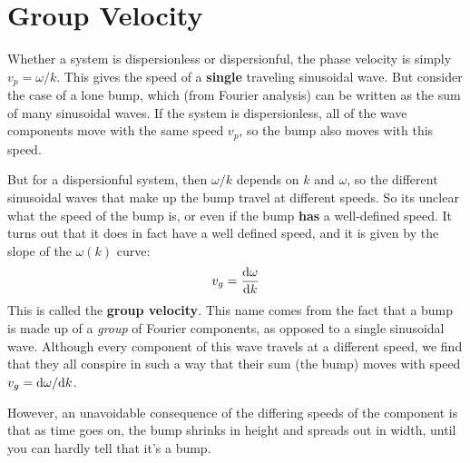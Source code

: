 \section{Group Velocity}
Whether a system is dispersionless or dispersionful, the phase velocity is simply $v_p = \omega/k$. This gives the speed of a \textbf{single} traveling sinusoidal wave. But consider the case of a lone bump, which (from Fourier analysis) can be written as the sum of many sinusoidal waves. If the system is dispersionless, all of the wave components move with the same speed $v_p$, so the bump also moves with this speed. 

But for a dispersionful system, then $\omega/k$ depends on $k$ and $\omega$, so the different sinusoidal waves that make up the bump travel at different speeds. So its unclear what the speed of the bump is, or even if the bump \textbf{has} a well-defined speed. It turns out that it does in fact have a well defined speed, and it is given by the slope of the $\omega(k)$ curve:
\[ v_g = \dv{\omega}{k} \]
This is called the \textbf{group velocity}. This name comes from the fact that a bump is made up of a \textit{group} of Fourier components, as opposed to a single sinusoidal wave. Although every component of this wave travels at a different speed, we find that they all conspire in such a way that their sum (the bump) moves with speed $v_g = \dd \omega/\dd k$.

However, an unavoidable consequence of the differing speeds of the component is that as time goes on, the bump shrinks in height and spreads out in width, until you can hardly tell that it's a bump.
